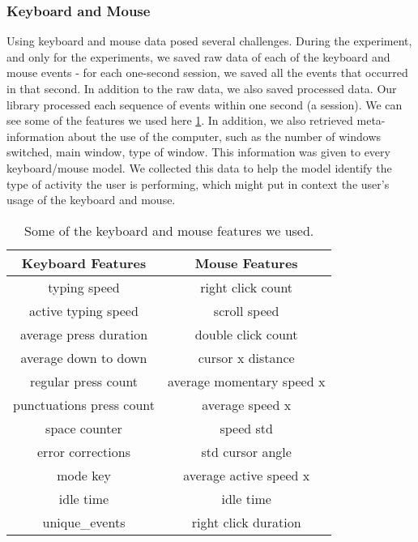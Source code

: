 
    \subsubsection{Keyboard and Mouse}

    Using keyboard and mouse data posed several challenges. During the experiment, and only for the experiments, 
    we saved raw data of each of the keyboard and mouse events - for each one-second session, we saved all the events that occurred in that second. 
    In addition to the raw data, we also saved processed data. Our library processed each sequence of events within one second (a session). 
    We can see some of the features we used here \ref{table:keyboard_mouse_features}. In addition, we also retrieved meta-information about the use of the computer, 
    such as the number of windows switched, main window, type of window. This information was given to every keyboard/mouse model. 
    We collected this data to help the model identify the type of activity the user is performing, which might put in context the user's usage of 
    the keyboard and mouse.
 
    \begin{table}[htp]
        \centering
        \begin{tabular}{cc}
        \toprule
        Keyboard Features        & Mouse Features            \\ \midrule
        typing speed             & right click count         \\
        active typing speed      & scroll speed              \\
        average press duration   & double click count        \\
        average down to down     & cursor x distance         \\
        regular press count      & average momentary speed x \\
        punctuations press count & average speed x           \\
        space counter            & speed std                 \\
        error corrections        & std cursor angle          \\
        mode key                 & average active speed x    \\
        idle time                & idle time                 \\
        unique\_events           & right click duration      \\ \bottomrule
        \end{tabular}
        \caption{Some of the keyboard and mouse features we used.}
        \label{table:keyboard_mouse_features}
    \end{table}

